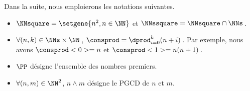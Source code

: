 Dans la suite, nous emploierons les notations suivantes.

\begin{itemize}
	\item $\NNsquare = \setgene{n^2, n \in \NN}$
	      et
	      $\NNssquare = \NNsquare \cap \NNs$\,.

	\item $\forall (n, k) \in \NNs \times \NN$\,, $\consprod = \dprod_{i = 0}^{k} (n + i)$\,. 
	Par exemple, nous avons $\consprod<0> = n$ et $\consprod<1> = n(n+1)$\,.

	\item $\PP$ désigne l'ensemble des nombres premiers.
	

	\smallskip
	\item $\forall (n , m) \in \NN^2$, $n \wedge m$ désigne le PGCD de $n$ et $m$.
	
%	
\end{itemize}